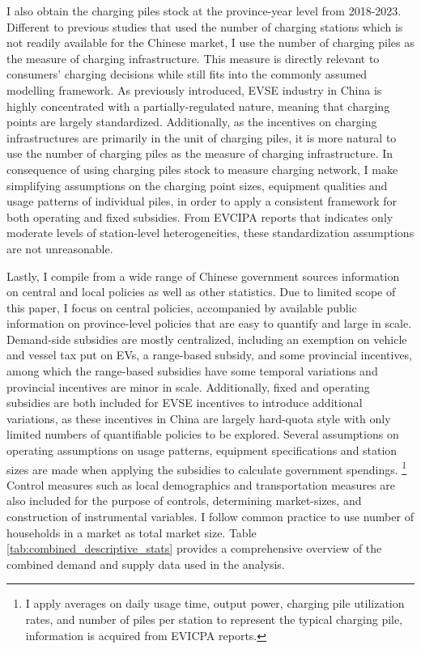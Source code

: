 \documentclass[12pt]{article}
\begin{document}
I also obtain the charging piles stock at the province-year level from 2018-2023.
Different to previous studies that used the number of charging stations which is not readily available for the Chinese market, 
I use the number of charging piles as the measure of charging infrastructure.
This measure is directly relevant to consumers' charging decisions while still fits into the commonly assumed modelling framework. 
As previously introduced, EVSE industry in China is highly concentrated with a partially-regulated nature, meaning that charging points are largely standardized.
Additionally, as the incentives on charging infrastructures are primarily in the unit of charging piles, it is more natural to use the number of charging piles as the measure of charging infrastructure.
In consequence of using charging piles stock to measure charging network, I make simplifying assumptions on the charging point sizes, 
equipment qualities and usage patterns of individual piles, in order to apply a consistent framework for both operating and fixed subsidies. 
From EVCIPA reports that indicates only moderate levels of station-level heterogeneities, these standardization assumptions are not unreasonable.

Lastly, I compile from a wide range of Chinese government sources information on central and local policies as well as other statistics.
Due to limited scope of this paper, I focus on central policies, accompanied by available public information on province-level policies that are easy to quantify and large in scale.
Demand-side subsidies are mostly centralized, including an exemption on vehicle and vessel tax put on EVs, a range-based subsidy, and some provincial incentives,
among which the range-based subsidies have some temporal variations and provincial incentives are minor in scale.
Additionally, fixed and operating subsidies are both included for EVSE incentives to introduce additional variations,
as these incentives in China are largely hard-quota style with only limited numbers of quantifiable policies to be explored.
Several assumptions on operating assumptions on usage patterns, equipment specifications and station sizes are made when applying the subsidies to calculate government spendings.
\footnote{I apply averages on daily usage time, output power, charging pile utilization rates, and number of piles per station to represent the typical charging pile, information is acquired from EVICPA reports.}
Control measures such as local demographics and transportation measures are also included for the purpose of controls, determining market-sizes, and construction of instrumental variables.
I follow common practice to use number of households in a market as total market size.
Table \ref{tab:combined_descriptive_stats} provides a comprehensive overview of the combined demand and supply data used in the analysis.
\end{document}
